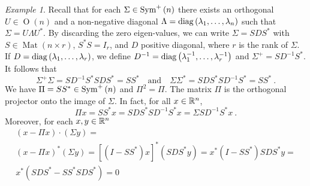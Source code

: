 \documentclass[12pt,a4paper]{amsart}
\newcommand{\MRof}[2]{\operatorname{Mat}\left(#1\times#2\right)}
\newcommand{\Oof}[1]{\operatorname{O}(#1)}
\theoremstyle{plain}%
\theoremstyle{definition}
\theoremstyle{remark}
\newtheorem{example}{Example}
\begin{document}
\begin{example}
  Recall that for each $\Sigma \in \operatorname{Sym}^{+}\left(n\right)$ there exists an orthogonal $U \in \Oof n$ and a non-negative diagonal $\Lambda = \operatorname{diag}\left(\lambda_1,\dots,\lambda_n\right)$ such that $\Sigma = U \Lambda U^*$. By discarding the zero eigen-values, we can write $\Sigma = S D S^*$ with $S \in \MRof n r$, $S^*S = I_r$, and $D$ positive diagonal, where $r$ is the rank of $\Sigma$. If $D = \operatorname{diag}\left(\lambda_1,\dots,\lambda_r\right)$, we define $D^{-1} = \operatorname{diag}\left(\lambda_1^{-1},\dots,\lambda_r^{-1}\right)$ and $\Sigma^+ = S D^{-1} S^*$. It follows that
  \begin{equation*}
\Sigma^+ \Sigma = S D^{-1} S^* S D S^* = SS^* \quad\text{and}\quad  \Sigma\Sigma^* = S D S^* S D^{-1} S^* =SS^* \ .
  \end{equation*}
We have $\Pi = SS^* \in \operatorname{Sym}^{+}\left(n\right)$ and $\Pi^2 = \Pi$. The matrix $\Pi$ is the orthogonal projector onto the image of $\Sigma$. In fact, for all $x \in \mathbb{R}^n$,
\begin{equation*}
\Pi x = SS^* x =  SDS^*SD^{-1}S^* x = \Sigma SD^{-1}S^* x \ .  
\end{equation*}
Moreover, for each $x,y \in \mathbb{R}^n$
\begin{multline*}
(x - \Pi x) \cdot (\Sigma y) =  \\ (x - \Pi x)^* (\Sigma y) = [(I - SS^*)x]^*(SDS^*y) = x^* (I-SS^*)SDS^* y = \\ x^*(SDS^* - SS^*SDS^*) =  0    
\end{multline*}
\end{example}
\end{document}
